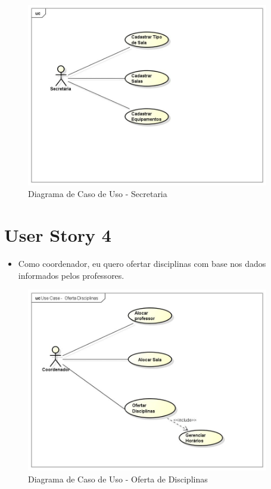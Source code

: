 \documentclass{abnt}
\begin{document}
		
		\begin{figure}[h]
			\begin{center}
				 \includegraphics[width=400px]{casoUsoSecretaria}
				 \caption{Diagrama de Caso de Uso - Secretaria}
				 \label{fig:casoUsoSecretaria}
			\end{center}
		\end{figure}
		\FloatBarrier
	\clearpage
	\section{User Story 4}

		\begin{itemize}
			\item Como coordenador, eu quero ofertar disciplinas com base nos dados informados pelos professores.
		\end{itemize}
	
		\begin{figure}[h]
			\begin{center}
				 \includegraphics[width=400px]{casoUsoOfertaDisciplinas}
				 \caption{Diagrama de Caso de Uso - Oferta de Disciplinas}
				 \label{fig:casoUsoOfertaDisciplina}
			\end{center}
		\end{figure}
		\FloatBarrier
	
\end{document}
